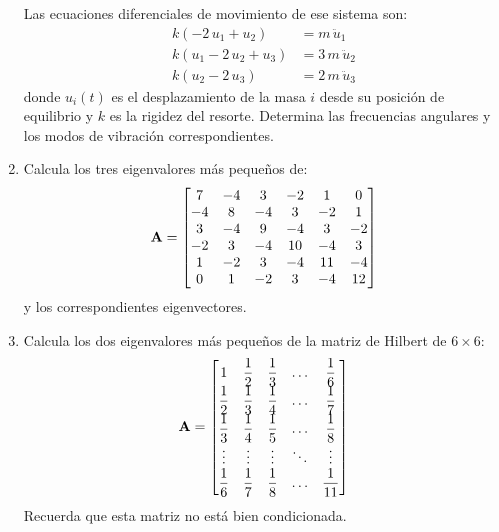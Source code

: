 \begin{enumerate}
\begin{figure}[H]
\end{figure}
Las ecuaciones diferenciales de movimiento de ese sistema son:
\begin{align*}
k (- 2 \, u_{1} + u_{2}) &= m \, \ddot{u}_{1} \\[0.5em]
k (u_{1} - 2 \, u_{2} + u_{3}) &= 3 \, m \, \ddot{u}_{2} \\[0.5em]
k (u_{2} - 2 \, u_{3}) &= 2 \, m \, \ddot{u}_{3}
\end{align*}
donde $u_{i} (t)$ es el desplazamiento de la masa $i$ desde su posición de equilibrio y $k$ es la rigidez del resorte. Determina las frecuencias angulares y los modos de vibración correspondientes.
\item Calcula los tres eigenvalores más pequeños de:
\begin{align*}
\vb{A} =
\begin{bmatrix}
7 & -4 & 3 & -2 & 1 & 0 \\
-4 & 8 & -4 & 3 & -2 & 1 \\
3 & -4 & 9 & -4 & 3 & -2 \\
-2 & 3 & -4 & 10 & -4 & 3 \\
1 & -2 & 3 & -4 & 11 & -4 \\
0 & 1 & -2 & 3 & -4 & 12
\end{bmatrix}
\end{align*}
y los correspondientes eigenvectores.
\item Calcula los dos eigenvalores más pequeños de la matriz de Hilbert de $6 \times 6$:
\renewcommand{\arraystretch}{2}
\begin{align*}
\vb{A} =
\begin{bmatrix}
1 & \dfrac{1}{2} & \dfrac{1}{3} & \ldots & \dfrac{1}{6} \\
\dfrac{1}{2} & \dfrac{1}{3} & \dfrac{1}{4} & \ldots & \dfrac{1}{7} \\
\dfrac{1}{3} & \dfrac{1}{4} & \dfrac{1}{5} & \ldots & \dfrac{1}{8} \\
\vdots & \vdots & \vdots & \ddots & \vdots \\
\dfrac{1}{6} & \dfrac{1}{7} & \dfrac{1}{8} & \ldots & \dfrac{1}{11}
\end{bmatrix}
\end{align*}
Recuerda que esta matriz no está bien condicionada.
\end{enumerate}

